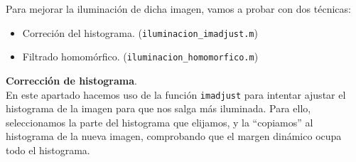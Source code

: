 \documentclass[12pt]{article}
\begin{document}
	\noindent Para mejorar la iluminación de dicha imagen, vamos a probar con dos técnicas:
	\begin{itemize}
		\item Correción del histograma. (\texttt{iluminacion\_imadjust.m})
		\item Filtrado homomórfico.
		(\texttt{iluminacion\_homomorfico.m})
	\end{itemize}

	\vspace{10px}

	\noindent \textbf{\large Corrección de histograma}. \\ 
	
	\noindent En este apartado hacemos uso de la función \texttt{imadjust} para intentar ajustar el histograma de la imagen para que nos salga más iluminada. Para ello, seleccionamos la parte del histograma que elijamos, y la ``copiamos'' al histograma de la nueva imagen, comprobando que el margen dinámico ocupa todo el histograma.\\
	
\end{document}
